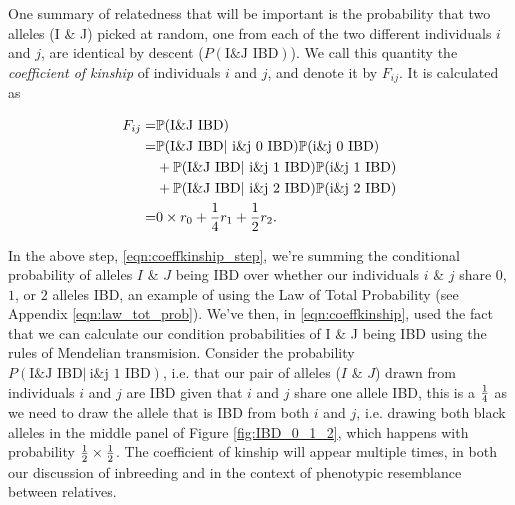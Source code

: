 One summary of relatedness that will be important is the probability that two
alleles (I \& J) picked at random, one from each of the two different individuals $i$
and $j$, are identical by descent ($P(\text{I\&J IBD})$). We call this quantity the \emph{coefficient
of kinship} of individuals $i$ and $j$, and denote it by $F_{ij}$. It is
calculated as

\begin{align}
  F_{ij} = & \P(\text{I\&J IBD} )\\
  =& \P(\text{I\&J IBD} |~ \text{i\&j  0 IBD}) \P(\text{i\&j  0 IBD})  \nonumber\\
  & + \P(\text{I\&J IBD} |~ \text{i\&j  1 IBD})
    \P(\text{i\&j  1 IBD})  \nonumber\\
  &+ \P(\text{I\&J IBD} |~ \text{i\&j  2 IBD}) \P(\text{i\&j  2 IBD}) \label{eqn:coeffkinship_step}\\
   =   &   0 \times r_0 + \frac{1}{4} r_1  + \frac{1}{2} r_2.
\label{eqn:coeffkinship}
\end{align}


In the above step, \eqn \eqref{eqn:coeffkinship_step}, we're summing the
conditional probability of alleles $I$ \& $J$ being IBD over whether our individuals $i$ \& $j$ share $0$, $1$,
or $2$ alleles IBD, an example of using the Law of Total Probability (see Appendix
\eqn \eqref{eqn:law_tot_prob}).  We've then, in \eqn \ref{eqn:coeffkinship}, used the fact that we can
calculate our condition probabilities of  I \& J being IBD using the
rules of Mendelian transmision. Consider the probability $
P(\text{I\&J IBD} |~ \text{i\&j  1 IBD})$, i.e. that our
pair of alleles ($I$ \& $J$) drawn from individuals $i$ and $j$ are IBD given that
$i$ and $j$ share one allele IBD, this is a $\nicefrac{1}{4}$ as we need to
draw the allele that is IBD from both $i$ and $j$, i.e. drawing both black
alleles in the middle panel of Figure \ref{fig:IBD_0_1_2}, which
happens with probability $\nicefrac{1}{2} \times \nicefrac{1}{2} $. 
The coefficient of kinship will appear multiple times, in both our discussion of
inbreeding and in the context of phenotypic resemblance between relatives.\\


